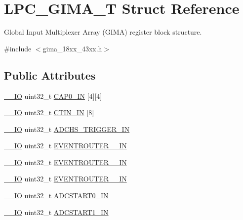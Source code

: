\hypertarget{struct_l_p_c___g_i_m_a___t}{}\section{L\+P\+C\+\_\+\+G\+I\+M\+A\+\_\+T Struct Reference}
\label{struct_l_p_c___g_i_m_a___t}


Global Input Multiplexer Array (G\+I\+MA) register block structure.  




{\ttfamily \#include $<$gima\+\_\+18xx\+\_\+43xx.\+h$>$}

\subsection*{Public Attributes}
\begin{DoxyCompactItemize}
\item 
\hyperlink{core__sc300_8h_aec43007d9998a0a0e01faede4133d6be}{\+\_\+\+\_\+\+IO} uint32\+\_\+t \hyperlink{struct_l_p_c___g_i_m_a___t_a3f073838210e08cff5480aaeac1a3ccd}{C\+A\+P0\+\_\+\+IN} \mbox{[}4\mbox{]}\mbox{[}4\mbox{]}
\item 
\hyperlink{core__sc300_8h_aec43007d9998a0a0e01faede4133d6be}{\+\_\+\+\_\+\+IO} uint32\+\_\+t \hyperlink{struct_l_p_c___g_i_m_a___t_a78c314980deaf0c1a4d3230e3e93c8e0}{C\+T\+I\+N\+\_\+\+IN} \mbox{[}8\mbox{]}
\item 
\hyperlink{core__sc300_8h_aec43007d9998a0a0e01faede4133d6be}{\+\_\+\+\_\+\+IO} uint32\+\_\+t \hyperlink{struct_l_p_c___g_i_m_a___t_aaa90fff3e142ac96e61de38907f024fa}{A\+D\+C\+H\+S\+\_\+\+T\+R\+I\+G\+G\+E\+R\+\_\+\+IN}
\item 
\hyperlink{core__sc300_8h_aec43007d9998a0a0e01faede4133d6be}{\+\_\+\+\_\+\+IO} uint32\+\_\+t \hyperlink{struct_l_p_c___g_i_m_a___t_ae8bceeb6e967f498f51f45ba367027a4}{E\+V\+E\+N\+T\+R\+O\+U\+T\+E\+R\+\_\+\_\+\+IN}
\item 
\hyperlink{core__sc300_8h_aec43007d9998a0a0e01faede4133d6be}{\+\_\+\+\_\+\+IO} uint32\+\_\+t \hyperlink{struct_l_p_c___g_i_m_a___t_adc9f1ec94c46bf4a858bbe439e673a8a}{E\+V\+E\+N\+T\+R\+O\+U\+T\+E\+R\+\_\+\_\+\+IN}
\item 
\hyperlink{core__sc300_8h_aec43007d9998a0a0e01faede4133d6be}{\+\_\+\+\_\+\+IO} uint32\+\_\+t \hyperlink{struct_l_p_c___g_i_m_a___t_ade191ef1ff718f439189b2cedbc39b69}{E\+V\+E\+N\+T\+R\+O\+U\+T\+E\+R\+\_\+\_\+\+IN}
\item 
\hyperlink{core__sc300_8h_aec43007d9998a0a0e01faede4133d6be}{\+\_\+\+\_\+\+IO} uint32\+\_\+t \hyperlink{struct_l_p_c___g_i_m_a___t_ae1014863cc2094360a9fae29bf8470ee}{A\+D\+C\+S\+T\+A\+R\+T0\+\_\+\+IN}
\item 
\hyperlink{core__sc300_8h_aec43007d9998a0a0e01faede4133d6be}{\+\_\+\+\_\+\+IO} uint32\+\_\+t \hyperlink{struct_l_p_c___g_i_m_a___t_ac21005da6bebbc5e17ff4bc950eb8784}{A\+D\+C\+S\+T\+A\+R\+T1\+\_\+\+IN}
\end{DoxyCompactItemize}


